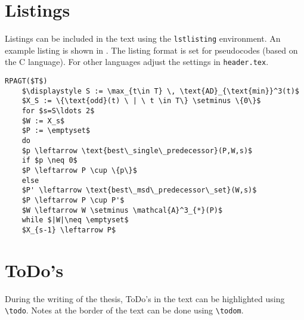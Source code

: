 \section{Listings}

Listings can be included in the text using the \verb|lstlisting| environment. An example listing is shown in . The listing format is set for pseudocodes (based on the C language). For other languages adjust the settings in \verb|header.tex|.

\begin{lstlisting}[float,caption=RPAGT Algorithm,label=lst:pseudocode]
	RPAGT($T$)
	$\displaystyle S := \max_{t\in T} \, \text{AD}_{\text{min}}^3(t)$
	$X_S := \{\text{odd}(t) \ | \ t \in T\} \setminus \{0\}$
	for $s=S\ldots 2$
	$W := X_s$
	$P := \emptyset$
	do
	$p \leftarrow \text{best\_single\_predecessor}(P,W,s)$
	if $p \neq 0$
	$P \leftarrow P \cup \{p\}$
	else
	$P' \leftarrow \text{best\_msd\_predecessor\_set}(W,s)$
	$P \leftarrow P \cup P'$
	$W \leftarrow W \setminus \mathcal{A}^3_{*}(P)$
	while $|W|\neq \emptyset$
	$X_{s-1} \leftarrow P$
\end{lstlisting}

\section{ToDo's}

During the writing of the thesis, ToDo's in the text can be highlighted using \verb|\todo|. Notes at the border of the text can be done using \verb|\todom|.
